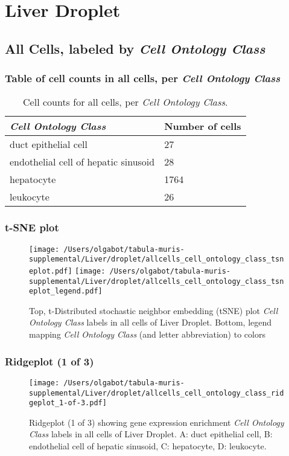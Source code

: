 \clearpage
\section{Liver Droplet}

\subsection{All Cells, labeled by \emph{Cell Ontology Class}}
\subsubsection{Table of cell counts in all cells, per \emph{Cell Ontology Class}}\begin{table}[h]
\centering
\label{my-label}
\begin{tabular}{@{}ll@{}}
\toprule

\emph{Cell Ontology Class}& Number of cells \\ \midrule
duct epithelial cell & 27 \\

endothelial cell of hepatic sinusoid & 28 \\

hepatocyte & 1764 \\

leukocyte & 26 \\
\bottomrule
\end{tabular}
\caption{Cell counts for all cells, per \emph{Cell Ontology Class}.}
\end{table}

\clearpage
\subsubsection{t-SNE plot}
\begin{figure}[h]
\centering
\texttt{[image: /Users/olgabot/tabula-muris-supplemental/Liver/droplet/allcells\_cell\_ontology\_class\_tsneplot.pdf]}
\texttt{[image: /Users/olgabot/tabula-muris-supplemental/Liver/droplet/allcells\_cell\_ontology\_class\_tsneplot\_legend.pdf]}
\caption{Top, t-Distributed stochastic neighbor embedding (tSNE) plot  \emph{Cell Ontology Class} labels in all cells of Liver Droplet. Bottom, legend mapping \emph{Cell Ontology Class} (and letter abbreviation) to colors}
\end{figure}


\clearpage

\subsubsection{Ridgeplot (1 of 3)}
\begin{figure}[h]
\centering
\texttt{[image: /Users/olgabot/tabula-muris-supplemental/Liver/droplet/allcells\_cell\_ontology\_class\_ridgeplot\_1-of-3.pdf]}

\caption{ Ridgeplot (1 of 3)  showing gene expression enrichment \emph{Cell Ontology Class} labels in all cells of Liver Droplet. A: duct epithelial cell, B: endothelial cell of hepatic sinusoid, C: hepatocyte, D: leukocyte.}
\end{figure}


